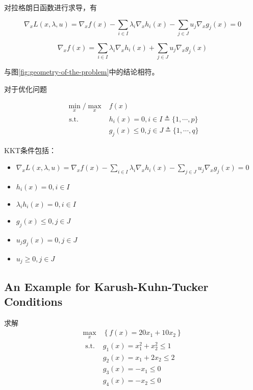 \begin{theorem}[拉格朗日函数求导]
    对拉格朗日函数进行求导，有

\begin{equation} \nabla_{x} L(x, \lambda, u)=\nabla_{x} f(x)-\sum_{i \in I} \lambda_{i} \nabla_{x} h_{i}(x)-\sum_{j \in J} u_{j} \nabla_{x} g_{j}(x)=0 \end{equation}

\begin{equation}\nabla_{x} f(x)=\sum_{i \in I} \lambda_{i} \nabla_{x} h_{i}(x)+\sum_{j \in J} u_{j} \nabla_{x} g_{j}(x)\end{equation}

    与图\ref{fig:geometry-of-the-problem}中的结论相符。
\end{theorem}

\begin{theorem} 
    对于优化问题

    \begin{equation}\begin{aligned}
        \min _{x} / \max_x &f(x) \\
\text{ s.t. } & h_{i}(x)=0, i \in I \triangleq\{1, \cdots, p\} \\
&g_{j}(x) \leq 0, j \in J \triangleq\{1, \cdots, q\}
    \end{aligned}\end{equation}
    
    KKT条件包括：
\begin{itemize}
    \item $\nabla_{x} L(x, \lambda, u)=\nabla_{x} f(x)-\sum_{i \in I} \lambda_{i} \nabla_{x} h_{i}(x)-\sum_{j \in J} u_{j} \nabla_{x} g_{j}(x)=0$
    \item $ h_{i}(x)=0, i \in I $
    \item $ \lambda_{i} h_{i}(x)=0, i \in I $
    \item $ g_{j}(x) \leq 0, j \in J $
    \item $ u_{j} g_{j}(x)=0, j \in J $
    \item $ u_{j} \geq 0, j \in J $
\end{itemize}
\end{theorem}


\subsection{An Example for Karush-Kuhn-Tucker Conditions}
   
\begin{problem}
    求解
\begin{equation}
\begin{aligned}
    \max _{x}&\left\{f(x)=20 x_{1}+10 x_{2}\right\} \\
  \text{ s.t. }  &   g_{1}(x)=x_{1}^{2}+x_{2}^{2} \leq 1 \\
  & g_{2}(x)=x_{1}+2 x_{2} \leq 2 \\
  &  g_{3}(x)=-x_{1} \leq 0 \\
    & g_{4}(x)=-x_{2} \leq 0 
\end{aligned}
\end{equation}
\end{problem}

